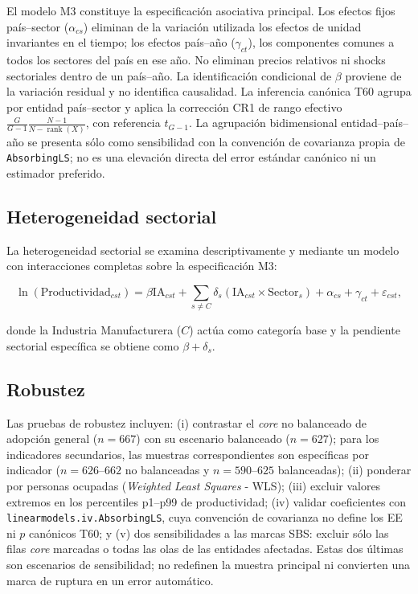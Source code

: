 \documentclass[12pt,a4paper]{article}
\begin{document}
El modelo M3 constituye la especificación asociativa principal. Los efectos fijos país--sector ($\alpha_{cs}$) eliminan de la variación utilizada los efectos de unidad invariantes en el tiempo; los efectos país--año ($\gamma_{ct}$), los componentes comunes a todos los sectores del país en ese año. No eliminan precios relativos ni shocks sectoriales dentro de un país--año. La identificación condicional de $\beta$ proviene de la variación residual y no identifica causalidad. La inferencia canónica T60 agrupa por entidad país--sector y aplica la corrección CR1 de rango efectivo $\frac{G}{G-1}\frac{N-1}{N-\operatorname{rank}(X)}$, con referencia $t_{G-1}$. La agrupación bidimensional entidad--país--año se presenta sólo como sensibilidad con la convención de covarianza propia de \texttt{AbsorbingLS}; no es una elevación directa del error estándar canónico ni un estimador preferido.

\subsection{Heterogeneidad sectorial}

La heterogeneidad sectorial se examina descriptivamente y mediante un modelo con interacciones completas sobre la especificación M3:

\begin{equation}
 \ln(\text{Productividad}_{cst}) = \beta \text{IA}_{cst} + \sum_{s \neq C} \delta_s(\text{IA}_{cst} \times \text{Sector}_s) + \alpha_{cs} + \gamma_{ct} + \varepsilon_{cst},
\end{equation}

donde la Industria Manufacturera ($C$) actúa como categoría base y la pendiente sectorial específica se obtiene como $\beta + \delta_s$.

\subsection{Robustez}

Las pruebas de robustez incluyen: (i) contrastar el \textit{core} no balanceado de adopción general ($n=667$) con su escenario balanceado ($n=627$); para los indicadores secundarios, las muestras correspondientes son específicas por indicador ($n=626\text{--}662$ no balanceadas y $n=590\text{--}625$ balanceadas); (ii) ponderar por personas ocupadas (\textit{Weighted Least Squares} - WLS); (iii) excluir valores extremos en los percentiles p1--p99 de productividad; (iv) validar coeficientes con \texttt{linearmodels.iv.AbsorbingLS}, cuya convención de covarianza no define los EE ni $p$ canónicos T60; y (v) dos sensibilidades a las marcas SBS: excluir sólo las filas \textit{core} marcadas o todas las olas de las entidades afectadas. Estas dos últimas son escenarios de sensibilidad; no redefinen la muestra principal ni convierten una marca de ruptura en un error automático.
\end{document}
